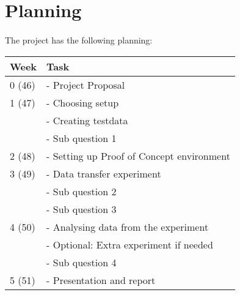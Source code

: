 \section{Planning}
\paragraph{}
The project has the following planning:

\center
\begin{tabular}{ | l| l | } 
\hline 
\textbf{Week} & \textbf{Task} \\
\hline
0 (46) 	& - Project Proposal \\
\hline
1 (47) 	& - Choosing setup \\
    & - Creating testdata \\
    & - Sub question 1 \\
\hline
2 (48)  & - Setting up Proof of Concept environment  \\ 
\hline
3 (49)  & - Data transfer experiment \\
    & - Sub question 2 \\
    & - Sub question 3 \\
\hline
4 (50)  & - Analysing data from the experiment \\
    & - Optional: Extra experiment if needed  \\
    & - Sub question 4 \\ 
\hline
5 (51)  & - Presentation and report \\ 
\hline
\end{tabular}
\label{tab:planning}
\flushleft